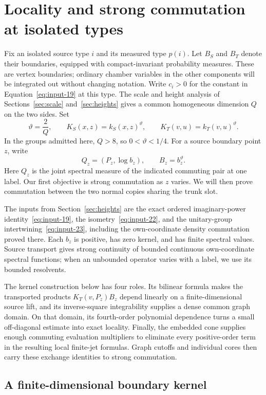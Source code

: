 \section{Locality and strong commutation at isolated types}
\label{sec:locality}

Fix an isolated source type $i$ and its measured type $p(i)$. Let $B_S$ and
$B_T$ denote their boundaries, equipped with compact-invariant probability
measures. These are vertex boundaries; ordinary chamber variables in the
other components will be integrated out without changing notation. Write
$c_i>0$ for the constant in Equation~\eqref{eq:input-19} at this type.
The scale and height analysis of Sections~\ref{sec:scale} and~\ref{sec:heights}
gives a common homogeneous dimension $Q$ on the two sides. Set
\[
 \vartheta=\frac{2}{Q},\qquad
 K_S(x,z)=k_S(x,z)^\vartheta,\qquad
 K_T(v,u)=k_T(v,u)^\vartheta.
\]
In the groups admitted here, $Q>8$, so $0<\vartheta<1/4$. For a source
boundary point $z$, write
\[
 Q_z=(P_z,\log b_z),\qquad B_z=b_z^\vartheta.
\]
Here $Q_z$ is the joint spectral measure of the indicated commuting pair
at one label. Our first objective is strong commutation as $z$ varies.
We will then prove commutation between the two normal copies sharing the
trunk slot.

The inputs from Section~\ref{sec:heights} are the exact ordered
imaginary-power identity~\eqref{eq:input-19}, the isometry~\eqref{eq:input-22},
and the unitary-group intertwining~\eqref{eq:input-23}, including the
own-coordinate density commutation proved there. Each $b_z$ is positive,
has zero kernel, and has finite spectral values. Source transport gives
strong continuity of bounded continuous own-coordinate spectral functions;
when an unbounded operator varies with a label, we use its bounded resolvents.

The kernel construction below has four roles. Its bilinear formula
makes the transported products $K_T(v,P_z)B_z$ depend linearly on a
finite-dimensional source lift, and its inverse-square integrability
supplies a dense common graph domain. On that domain, its fourth-order
polynomial dependence turns a small off-diagonal estimate into exact
locality. Finally, the embedded cone supplies enough commuting evaluation
multipliers to eliminate every positive-order term in the resulting local
finite-jet formulas. Graph cutoffs and individual cores then carry these
exchange identities to strong commutation.

\subsection{A finite-dimensional boundary kernel}

